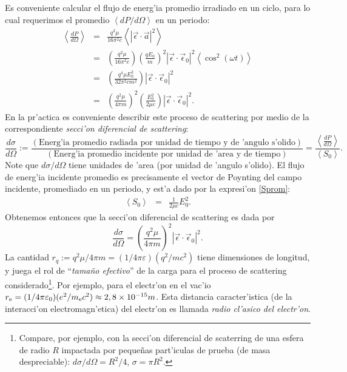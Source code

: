 Es conveniente calcular el flujo de energ'ia promedio irradiado en un ciclo,
para lo cual requerimos el promedio $\left\langle
{dP}/{d\Omega}\right\rangle$ en un periodo:
\begin{eqnarray}
\left\langle\frac{dP}{d\Omega}\right\rangle  &=&
\frac{q^2\mu}{16\pi^2 c}\left\langle |\vec{\epsilon}\cdot\vec{a}|^2\right\rangle \\
&=&\left(\frac{q^2\mu}{16\pi^2 c}\right)\left(\frac{qE_0}{m}\right)^2\left|
\vec{\epsilon}\cdot\vec{\epsilon}_0\right|^2\left\langle
\cos^2(\omega t)\right\rangle \\
&=&\left(\frac{q^4\mu E_0^2}{32\pi^2 c m^2}\right)\left|
\vec{\epsilon}\cdot\vec{\epsilon}_0\right|^2\\
&=&\left(\frac{q^2\mu}{4\pi m}\right)^2\left(\frac{E_0^2}{2\mu c}\right) \left|
\vec{\epsilon}\cdot\vec{\epsilon}_0\right|^2.
\end{eqnarray}
En la pr'actica es conveniente describir este proceso de scattering por medio de
la correspondiente  \textit{secci'on diferencial de scattering}:
\begin{equation}
\frac{d\sigma}{d\Omega}:=\frac{\left( \text{Energ'ia promedio radiada por unidad
de tiempo y de 'angulo s'olido}\right) }{\left( \text{Energ'ia promedio
incidente por unidad de 'area y de tiempo}\right) }=\frac{\left\langle
\frac{dP}{d\Omega}\right\rangle}{\left\langle S_0\right\rangle}.
\end{equation}
Note que ${d\sigma}/{d\Omega}$ tiene unidades de 'area (por unidad de 'angulo
s'olido).
El flujo de energ'ia incidente promedio es precisamente el vector de Poynting
del campo incidente, promediado en un periodo, y est'a dado por la expresi'on \eqref{Sprom}:
\begin{eqnarray}
\left\langle S_0\right\rangle &=&\frac{1}{2\mu c}E_0^2.
\end{eqnarray}
Obtenemos entonces que la secci'on diferencial de scattering es dada por
\begin{equation}
\boxed{\frac{d\sigma}{d\Omega}  =\left(\frac{q^2\mu}{4\pi m}\right)^2\left|
\vec{\epsilon}\cdot\vec{\epsilon}_0\right|^2 .}\label{seeT}
\end{equation}
La cantidad $r_q:={q^2\mu}/{4\pi m}=(1/{4\pi\varepsilon})({q^2}/{mc^2})$ tiene dimensiones de longitud, y juega el rol de ``\textit{tama\~no efectivo}'' de la carga para el proceso de scattering considerado\footnote{Compare, por ejemplo, con la secci'on diferencial de scaterring de una esfera de radio $R$ impactada por peque\~nas part'iculas de prueba (de masa despreciable): $d\sigma/d\Omega=R^2/4$, $\sigma=\pi R^2$.}. Por ejemplo, para el electr'on en el vac'io $r_{\rm e}=(1/{4\pi\varepsilon_0})({e^2}/{m_{\rm e}c^2})\approx 2,8\times 10^{-15}m$. Esta distancia caracter'istica (de la interacci'on electromagn'etica) del electr'on es llamada \textit{radio cl'asico del electr'on}.

